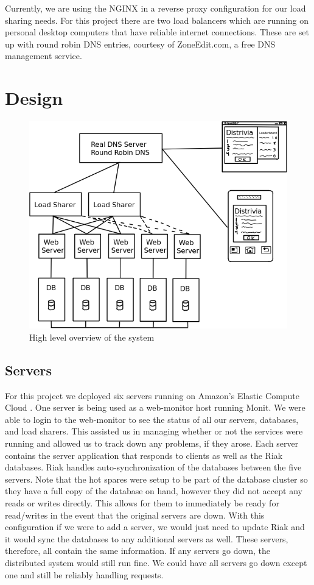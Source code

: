 \documentclass{dependencies/acm_proc_article-sp}
\begin{document}
Currently, we are using the NGINX \cite{nginx} in a reverse proxy configuration for our load sharing needs.
For this project there are two load balancers which are running on personal desktop computers that have reliable internet connections.
These are set up with round robin DNS entries, courtesy of ZoneEdit.com, a free DNS management service.
\section{Design}
\begin{figure}[h!]
  \centering
    \includegraphics[scale=0.4]{diagram.png}
   \caption{High level overview of the system}
 \end{figure}
\subsection{Servers}
For this project we deployed six servers running on Amazon's Elastic Compute Cloud \cite{aec}.
One server is being used as a web-monitor host running Monit\cite{monit}.
We were able to login to the web-monitor to see the status of all our servers, databases, and load sharers.
This assisted us in managing whether or not the services were running and allowed us to track down any problems, if they arose.
Each server contains the server application that responds to clients as well as the Riak \cite{riak} databases.
Riak handles auto-synchronization of the databases between the five servers.
Note that the hot spares were setup to be part of the database cluster so they have a full copy of the database on hand, however they did not accept any reads or writes directly.
This allows for them to immediately be ready for read/writes in the event that the original servers are down.
With this configuration if we were to add a server, we would just need to update Riak and it would sync the databases to any additional servers as well.
These servers, therefore, all contain the same information.
If any servers go down, the distributed system would still run fine.
We could have all servers go down except one and still be reliably handling requests.
\end{document}
